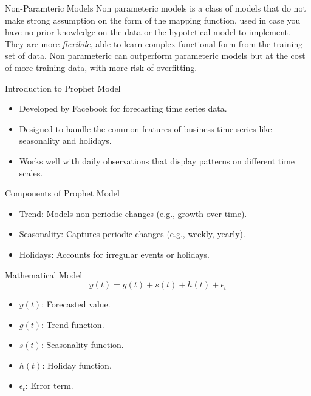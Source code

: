 \documentclass[aspectratio=169,hyperref={pdfpagelabels=false}]{beamer}
\begin{document}
\begin{frame}{Non-Paramteric Models}
  Non parameteric models is a class of models that do not make strong assumption on the form of the mapping function, used in case you have no prior knowledge on the data or the hypotetical model to implement.
  They are more \textit{flexibile}, able to learn complex functional form from the training set of data. Non parameteric
  can outperform parameteric models but at the cost of more training data, with more risk of overfitting. 

\end{frame}


\begin{frame}{Introduction to Prophet Model}
  \begin{itemize}
      \item Developed by Facebook for forecasting time series data.
      \item Designed to handle the common features of business time series like seasonality and holidays.
      \item Works well with daily observations that display patterns on different time scales.
  \end{itemize}
\end{frame}


\begin{frame}{Components of Prophet Model}
  \begin{itemize}
      \item Trend: Models non-periodic changes (e.g., growth over time).
      \item Seasonality: Captures periodic changes (e.g., weekly, yearly).
      \item Holidays: Accounts for irregular events or holidays.
  \end{itemize}
\end{frame}


\begin{frame}{Mathematical Model}
  \begin{equation}
      y(t) = g(t) + s(t) + h(t) + \epsilon_t
  \end{equation}
  \begin{itemize}
      \item $y(t)$: Forecasted value.
      \item $g(t)$: Trend function.
      \item $s(t)$: Seasonality function.
      \item $h(t)$: Holiday function.
      \item $\epsilon_t$: Error term.
  \end{itemize}
\end{frame}
\end{document}
